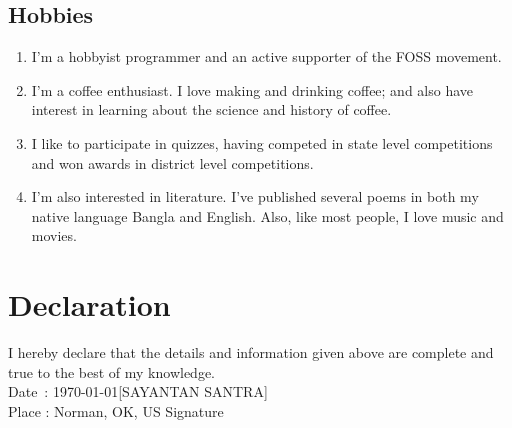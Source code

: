 \documentclass{article}
\begin{document}
\subsection{Hobbies}
\begin{enumerate}[label=(\alph*)]
	\item I'm a hobbyist programmer and an active supporter of the FOSS movement.
	\item I'm a coffee enthusiast. I love making and drinking coffee; and also have interest in learning about the science and history of
	      coffee.
	\item I like to participate in quizzes, having competed in state level competitions and won awards in district level competitions.
	\item I'm also interested in literature. I've published several poems in both my native language Bangla and English. Also, like most
	      people, I love music and movies.
\end{enumerate}

\section{Declaration}
I hereby declare that the details and information given above are complete and true to the best of my knowledge.
\vspace*{2cm} \\
Date \,: \today \hfill [SAYANTAN SANTRA] \\
Place  : Norman, OK, US \hfill Signature \hspace{1cm}
\end{document}
